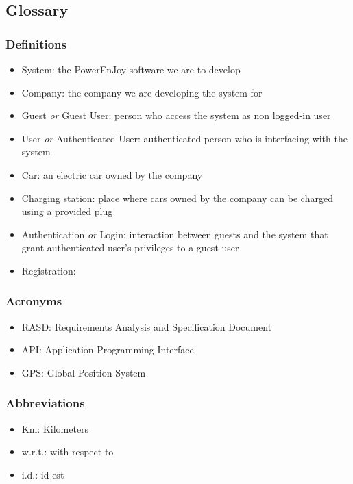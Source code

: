 \subsection{Glossary}
	\subsubsection{Definitions}
	\begin{itemize}
		\item System: the PowerEnJoy software we are to develop
		\item Company: the company we are developing the system for
		\item Guest \emph{or} Guest User: person who access the system as non logged-in user
		\item User \emph{or} Authenticated User: authenticated person who is interfacing with the system
		\item Car: an electric car owned by the company
		\item Charging station: place where cars owned by the company can be charged using a provided plug
		\item Authentication \emph{or} Login: interaction between guests and the system that grant authenticated user's privileges to a guest user
		\item Registration: 
	\end{itemize}
\subsubsection{Acronyms}
	\begin{itemize}
		\item RASD: Requirements Analysis and Specification Document
		\item API: Application Programming Interface
		\item GPS: Global Position System
	\end{itemize}
\subsubsection{Abbreviations}
	\begin{itemize}
		\item Km: Kilometers
		\item w.r.t.: with respect to
		\item i.d.: id est
	\end{itemize}